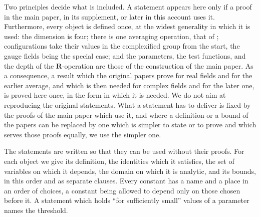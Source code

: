 \documentclass[11pt]{preprint}
\numberwithin{equation}{section}
\begin{document}
Two principles decide what is included. A statement appears here only if a proof in the main paper, in its supplement, or later in this account uses it. Furthermore, every object is defined once, at the widest generality in which it is used: the dimension is four; there is one averaging operation, that of \cite[(0.4), p.~253]{BalabanRG1}; configurations take their values in the complexified group from the start, the gauge fields being the special case; and the parameters, the test functions, and the depth of the $\mathbf R$-operation are those of the construction of the main paper. As a consequence, a result which the original papers prove for real fields and for the earlier average, and which is then needed for complex fields and for the later one, is proved here once, in the form in which it is needed. We do not aim at reproducing the original statements. What a statement has to deliver is fixed by the proofs of the main paper which use it, and where a definition or a bound of the papers can be replaced by one which is simpler to state or to prove and which serves those proofs equally, we use the simpler one.

The statements are written so that they can be used without their proofs. For each object we give its definition, the identities which it satisfies, the set of variables on which it depends, the domain on which it is analytic, and its bounds, in this order and as separate clauses. Every constant has a name and a place in an order of choices, a constant being allowed to depend only on those chosen before it. A statement which holds ``for sufficiently small'' values of a parameter names the threshold.
\end{document}
